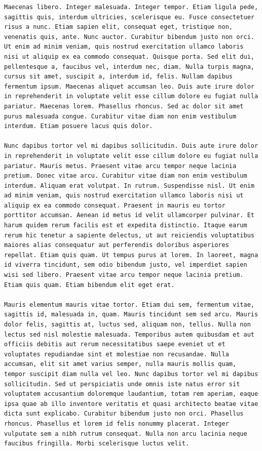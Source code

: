 \documentclass[a4paper, 12pt]{article}
\begin{document}
\begin{verbatim}
Maecenas libero. Integer malesuada. Integer tempor. Etiam ligula pede, sagittis quis, interdum ultricies, scelerisque eu. Fusce consectetuer risus a nunc. Etiam sapien elit, consequat eget, tristique non, venenatis quis, ante. Nunc auctor. Curabitur bibendum justo non orci. Ut enim ad minim veniam, quis nostrud exercitation ullamco laboris nisi ut aliquip ex ea commodo consequat. Quisque porta. Sed elit dui, pellentesque a, faucibus vel, interdum nec, diam. Nulla turpis magna, cursus sit amet, suscipit a, interdum id, felis. Nullam dapibus fermentum ipsum. Maecenas aliquet accumsan leo. Duis aute irure dolor in reprehenderit in voluptate velit esse cillum dolore eu fugiat nulla pariatur. Maecenas lorem. Phasellus rhoncus. Sed ac dolor sit amet purus malesuada congue. Curabitur vitae diam non enim vestibulum interdum. Etiam posuere lacus quis dolor.

Nunc dapibus tortor vel mi dapibus sollicitudin. Duis aute irure dolor in reprehenderit in voluptate velit esse cillum dolore eu fugiat nulla pariatur. Mauris metus. Praesent vitae arcu tempor neque lacinia pretium. Donec vitae arcu. Curabitur vitae diam non enim vestibulum interdum. Aliquam erat volutpat. In rutrum. Suspendisse nisl. Ut enim ad minim veniam, quis nostrud exercitation ullamco laboris nisi ut aliquip ex ea commodo consequat. Praesent in mauris eu tortor porttitor accumsan. Aenean id metus id velit ullamcorper pulvinar. Et harum quidem rerum facilis est et expedita distinctio. Itaque earum rerum hic tenetur a sapiente delectus, ut aut reiciendis voluptatibus maiores alias consequatur aut perferendis doloribus asperiores repellat. Etiam quis quam. Ut tempus purus at lorem. In laoreet, magna id viverra tincidunt, sem odio bibendum justo, vel imperdiet sapien wisi sed libero. Praesent vitae arcu tempor neque lacinia pretium. Etiam quis quam. Etiam bibendum elit eget erat.

Mauris elementum mauris vitae tortor. Etiam dui sem, fermentum vitae, sagittis id, malesuada in, quam. Mauris tincidunt sem sed arcu. Mauris dolor felis, sagittis at, luctus sed, aliquam non, tellus. Nulla non lectus sed nisl molestie malesuada. Temporibus autem quibusdam et aut officiis debitis aut rerum necessitatibus saepe eveniet ut et voluptates repudiandae sint et molestiae non recusandae. Nulla accumsan, elit sit amet varius semper, nulla mauris mollis quam, tempor suscipit diam nulla vel leo. Nunc dapibus tortor vel mi dapibus sollicitudin. Sed ut perspiciatis unde omnis iste natus error sit voluptatem accusantium doloremque laudantium, totam rem aperiam, eaque ipsa quae ab illo inventore veritatis et quasi architecto beatae vitae dicta sunt explicabo. Curabitur bibendum justo non orci. Phasellus rhoncus. Phasellus et lorem id felis nonummy placerat. Integer vulputate sem a nibh rutrum consequat. Nulla non arcu lacinia neque faucibus fringilla. Morbi scelerisque luctus velit.


\end{verbatim}
\end{document}
